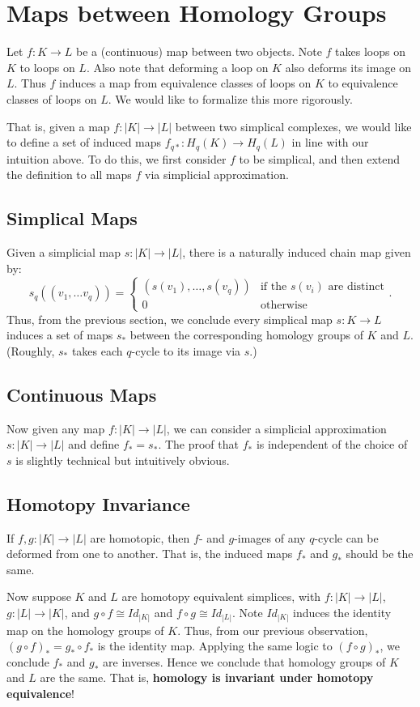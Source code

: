 \section{Maps between Homology Groups}

Let $f: K \to L$ be a (continuous) map between two objects. Note $f$ takes loops on $K$ to loops on $L$. Also note that deforming a loop on $K$ also deforms its image on $L$. Thus $f$ induces a map from equivalence classes of loops on $K$ to equivalence classes of loops on $L$. We would like to formalize this more rigorously.

That is, given a map $f: |K| \to |L|$ between two simplical complexes, we would like to define a set of induced maps $f_{q*}: H_q(K) \to H_q(L)$ in line with our intuition above. To do this, we first consider $f$ to be simplical, and then extend the definition to all maps $f$ via simplicial approximation.

\subsection{Simplical Maps}
Given a simplicial map $s: |K| \to |L|$, there is a naturally induced chain map given by:
\[
    s_q\left((v_1, \dots v_q)\right) =
    \begin{cases}
        \left(s(v_1), \dots, s(v_q)\right) & \text{if the $s(v_i)$ are distinct} \\
        0 & \text{otherwise}
    \end{cases}.
\]
Thus, from the previous section, we conclude every simplical map $s: K \to L$ induces a set of maps $s_*$ between the corresponding homology groups of $K$ and $L$. (Roughly, $s_*$ takes each $q$-cycle to its image via $s$.)

\subsection{Continuous Maps}
Now given any map $f: |K| \to |L|$, we can consider a simplicial approximation $s: |K| \to |L|$ and define $f_* = s_*$. The proof that $f_*$ is independent of the choice of $s$ is slightly technical but intuitively obvious.

\subsection{Homotopy Invariance}
If $f,g: |K| \to |L|$ are homotopic, then $f$- and $g$-images of any $q$-cycle can be deformed from one to another. That is, the induced maps $f_*$ and $g_*$ should be the same.

Now suppose $K$ and $L$ are homotopy equivalent simplices, with $f: |K| \to |L|$, $g: |L| \to |K|$, and $g \circ f \cong Id_{|K|}$ and $f \circ g \cong Id_{|L|}$. Note $Id_{|K|}$ induces the identity map on the homology groups of $K$. Thus, from our previous observation, $(g \circ f)_* = g_* \circ f_*$ is the identity map. Applying the same logic to $(f \circ g)_*$, we conclude $f_*$ and $g_*$ are inverses. Hence we conclude that homology groups of $K$ and $L$ are the same. That is, \textbf{homology is invariant under homotopy equivalence}!